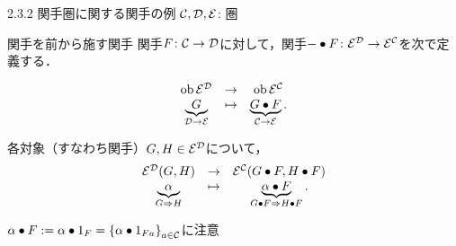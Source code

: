 \documentclass[uplatex,a4paper,dvipdfmx,aspectratio=169,10pt]{beamer}
\begin{document}
\begin{frame}[fragile]{2.3.2 関手圏に関する関手の例}
    $\mathcal{C}, \mathcal{D}, \mathcal{E}$: 圏

    \begin{exampleblock}{ 関手を前から施す関手}
        関手$F \colon \mathcal{C} \to \mathcal{D}$に対して，関手$- \bullet F \colon \mathcal{E}^{\mathcal{D}} \to \mathcal{E}^{\mathcal{C}}$を次で定義する．
        \begin{description}[対象への作用:]
            \item[対象への作用:]
                \begin{equation*}
                    \begin{array}{ccc}
                        \operatorname{{\mathrm{ob}}} \mathcal{E}^{\mathcal{D}} & \to & \operatorname{{\mathrm{ob}}} \mathcal{E}^{\mathcal{C}}  \\
                        \underbrace{G}_{\mathcal{D} \to \mathcal{E}} & \mapsto & \underbrace{G \bullet F}_{\mathcal{C} \to \mathcal{E}}.
                    \end{array}
                \end{equation*}
            \item[射への作用:] 各対象（すなわち関手）$G, H \in \mathcal{E}^{\mathcal{D}}$について，
                \begin{equation*}
                    \begin{array}{ccc}
                        \mathcal{E}^{\mathcal{D}}(G, H) & \to & \mathcal{E}^{\mathcal{C}}(G \bullet F, H \bullet F)  \\
                        \underbrace{\alpha}_{G \Rightarrow H} & \mapsto & \underbrace{\alpha \bullet F}_{G \bullet F \Rightarrow H \bullet F}.
                    \end{array}
                \end{equation*}
        \end{description}
    \end{exampleblock}
    $\alpha \bullet F := \alpha \bullet 1_F = \qty{\alpha \bullet 1_{Fa}}_{a \in \mathcal{C}}$に注意
\end{frame}
\end{document}

